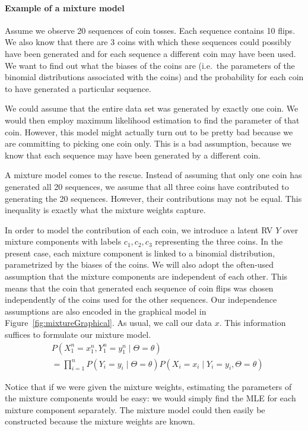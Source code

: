 \documentclass[a4paper,11pt,leqno]{report}\usepackage[]{graphicx}\usepackage[]{color}
\begin{document}
\paragraph{Example of a mixture model} Assume we observe 20 sequences of coin tosses. Each sequence
contains 10 flips. We also know that there are 3 coins with which these sequences could possibly have been
generated and for each sequence a different coin may have been used. We want to find out what the biases
of the coins are (i.e.\ the parameters of the binomial distributions associated with the coins) and the probability
for each coin to have generated a particular sequence.
 
We could assume that the entire data set was generated by exactly one coin. We would then employ maximum likelihood estimation 
to find the parameter of that coin. However, this model might actually turn out to be
pretty bad because we are committing to picking one coin only. This is
a bad assumption, because we know that each sequence may have been generated by a different coin. 

A mixture model comes to the rescue. Instead of assuming that only one coin has generated all 20 sequences,
we assume that all three coins have contributed to generating the 20 sequences. However, their contributions
may not be equal. This inequality is exactly what the mixture weights capture. 

In order to model the contribution of each coin, we introduce a latent RV $ Y $ over mixture components with labels $ c_{1}, c_{2}, c_{3} $ representing the three coins.
In the present case, each mixture component is linked to a binomial distribution, parametrized by the biases of
the coins. We will also adopt the often-used assumption
that the mixture components are independent of each other. This means that the coin that generated each
sequence of coin flips was chosen independently of the coins used for the other sequences. Our independence assumptions
are also encoded in the graphical model in Figure~\eqref{fig:mixtureGraphical}. As usual, we call our data $ x $. 
This information suffices to formulate our mixture model.
\begin{align} 
&P(X_1^n=x_{1}^{n},Y_{1}^{n}=y_{1}^{n}\mid \Theta=\theta) \label{eq:mixtureExample} \\
&= \prod_{i=1}^{n} P(Y_{i}= y_{i} \mid \Theta=\theta)P(X_{i}=x_{i} \mid Y_{i}=y_{i},\Theta=\theta) \nonumber 
\end{align}

Notice that if we were given the mixture weights, estimating
the parameters of the mixture components would be easy: we would simply find the MLE for each mixture component separately. The mixture
model could then easily be constructed because the mixture weights are known. 
\end{document}

